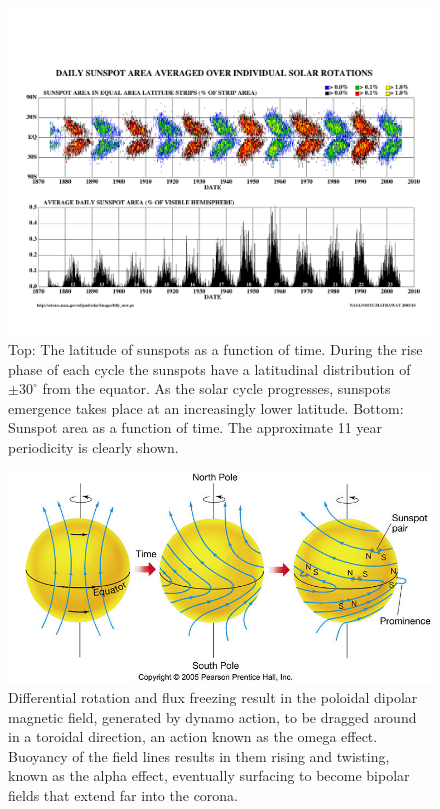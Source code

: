 \begin{figure}[!t]
\begin{center}
\includegraphics[scale=0.55, trim =1cm 1cm 0cm 3cm]{images/bfly_new.pdf}
\caption{Top: The latitude of sunspots as a function of time. During the rise phase of each cycle the sunspots have a latitudinal distribution of $\pm30^{\circ}$ from the equator.  As the solar cycle progresses, sunspots emergence takes place at an increasingly lower latitude. Bottom: Sunspot area as a function of time. The approximate 11 year periodicity is clearly shown.}
\label{fig:butterfly} 
\end{center}
\end{figure}


\begin{figure}[!h]
\begin{center}
\includegraphics[]{images/Babcock}
\caption{Differential rotation and flux freezing result in the poloidal dipolar magnetic field, generated by dynamo action, to be dragged around in a toroidal direction, an action known as the omega effect. Buoyancy of the field lines results in them rising and twisting, known as the alpha effect, eventually surfacing to become bipolar fields that extend far into the corona.}
\label{fig:Babcock} 
\end{center}
\end{figure}


